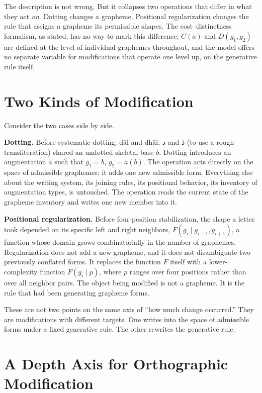 \documentclass[11pt]{article}
\newcommand{\ar}[1]{\textarabic{#1}}
\begin{document}
The description is not wrong. But it collapses two operations that differ in
what they act \emph{on}. Dotting changes a grapheme. Positional
regularization changes the rule that assigns a grapheme its permissible
shapes. The cost--distinctness formalism, as stated, has no way to mark this
difference; $C(a)$ and $D(g_1,g_2)$ are defined at the level of individual
graphemes throughout, and the model offers no separate variable for
modifications that operate one level up, on the generative rule itself.

\section{Two Kinds of Modification}

Consider the two cases side by side.

\textbf{Dotting.} Before systematic dotting, d\=al and dh\=al, \ar{د} and
\ar{ذ} (to use a rough
transliteration) shared an undotted skeletal base $b$. Dotting introduces an
augmentation $a$ such that $g_1 = b$, $g_2 = a(b)$. The operation acts
directly on the space of admissible graphemes: it adds one new admissible
form. Everything else about the writing system, its joining rules, its
positional behavior, its inventory of augmentation types, is untouched. The
operation reads the current state of the grapheme inventory and writes one
new member into it.

\textbf{Positional regularization.} Before four-position stabilization, the
shape a letter took depended on its specific left and right neighbors,
$F(g_i \mid g_{i-1}, g_{i+1})$, a function whose domain grows combinatorially
in the number of graphemes. Regularization does not add a new grapheme, and
it does not disambiguate two previously conflated forms. It replaces the
function $F$ itself with a lower-complexity function $F(g_i \mid p)$, where
$p$ ranges over four positions rather than over all neighbor pairs. The
object being modified is not a grapheme. It is the rule that had been
generating grapheme forms.

These are not two points on the same axis of \textquotedblleft how much
change occurred.\textquotedblright{} They are modifications with different
targets. One writes into the space of admissible forms under a fixed
generative rule. The other rewrites the generative rule.

\section{A Depth Axis for Orthographic Modification}
\end{document}
